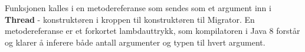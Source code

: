 Funksjonen kalles i en metodereferanse som sendes som et argument inn i \textbf{Thread} - konstruktøren i kroppen til konstruktøren til Migrator. En metodereferanse er et forkortet lambdauttrykk, som kompilatoren i Java 8 forstår og klarer å inferere både antall argumenter og typen til hvert argument.


